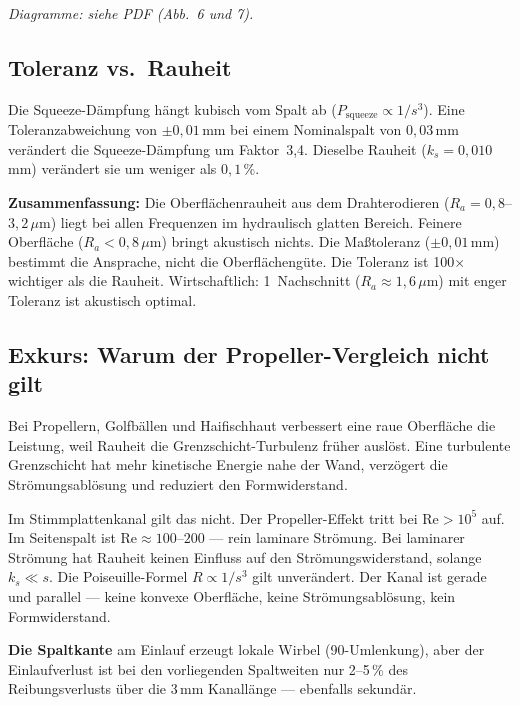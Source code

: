 \documentclass[11pt,a4paper]{article}
\begin{document}
\textit{Diagramme: siehe PDF (Abb.~6 und 7).}

\subsection{Toleranz vs.\ Rauheit}

Die Squeeze-Dämpfung hängt kubisch vom Spalt ab ($P_\text{squeeze} \propto 1/s^3$). Eine Toleranzabweichung von $\pm 0{,}01$\,mm bei einem Nominalspalt von $0{,}03$\,mm verändert die Squeeze-Dämpfung um Faktor~3,4. Dieselbe Rauheit ($k_s = 0{,}010$\,mm) verändert sie um weniger als $0{,}1\,\%$.

\begin{keybox}
\textbf{Zusammenfassung:} Die Oberflächenrauheit aus dem Drahterodieren ($R_a = 0{,}8$--$3{,}2\,\mu$m) liegt bei allen Frequenzen im hydraulisch glatten Bereich. Feinere Oberfläche ($R_a < 0{,}8\,\mu$m) bringt akustisch nichts. Die Maßtoleranz ($\pm 0{,}01$\,mm) bestimmt die Ansprache, nicht die Oberflächengüte. Die Toleranz ist 100$\times$ wichtiger als die Rauheit. Wirtschaftlich: 1~Nachschnitt ($R_a \approx 1{,}6\,\mu$m) mit enger Toleranz ist akustisch optimal.
\end{keybox}

\subsection{Exkurs: Warum der Propeller-Vergleich nicht gilt}

Bei Propellern, Golfbällen und Haifischhaut verbessert eine raue Oberfläche die Leistung, weil Rauheit die Grenzschicht-Turbulenz früher auslöst. Eine turbulente Grenzschicht hat mehr kinetische Energie nahe der Wand, verzögert die Strömungsablösung und reduziert den Formwiderstand.

Im Stimmplattenkanal gilt das nicht. Der Propeller-Effekt tritt bei $\text{Re} > 10^5$ auf. Im Seitenspalt ist $\text{Re} \approx 100$--$200$ --- rein laminare Strömung. Bei laminarer Strömung hat Rauheit keinen Einfluss auf den Strömungswiderstand, solange $k_s \ll s$. Die Poiseuille-Formel $R \propto 1/s^3$ gilt unverändert. Der Kanal ist gerade und parallel --- keine konvexe Oberfläche, keine Strömungsablösung, kein Formwiderstand.

\textbf{Die Spaltkante} am Einlauf erzeugt lokale Wirbel (90\textdegree-Umlenkung), aber der Einlaufverlust ist bei den vorliegenden Spaltweiten nur 2--5\,\% des Reibungsverlusts über die 3\,mm Kanallänge --- ebenfalls sekundär.
\end{document}
